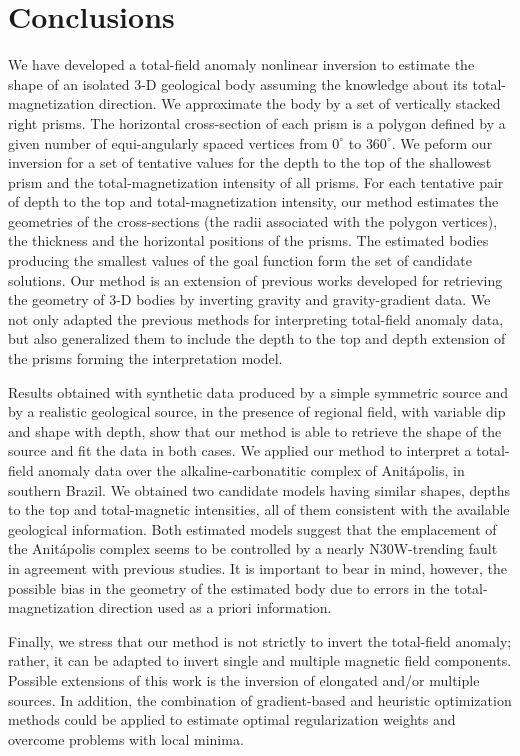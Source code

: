 \section{Conclusions}

We have developed a total-field anomaly nonlinear inversion to estimate the shape 
of an isolated 3-D geological body assuming the knowledge about its 
total-magnetization direction. We approximate the body by a set of vertically 
stacked right prisms. The horizontal cross-section of each prism is a polygon defined by a given number of
equi-angularly spaced vertices from $0^\circ$ to $360^\circ$. 
We peform our inversion for a set of tentative values for the depth to the top 
of the shallowest prism and the total-magnetization intensity of all prisms. 
For each tentative pair of depth to the top and total-magnetization intensity,
our method estimates the geometries of the cross-sections (the radii associated with the polygon vertices), the thickness and the horizontal positions of the prisms. 
The estimated bodies producing the smallest values of the goal function form the 
set of candidate solutions.
Our method is an extension of previous works developed for retrieving the geometry 
of 3-D bodies by inverting gravity and gravity-gradient data. 
We not only adapted the previous methods for interpreting total-field anomaly data,
but also generalized them to include the depth to the top and depth extension of 
the prisms forming the interpretation model.

Results obtained with synthetic data produced by a simple symmetric source 
and by a realistic geological source, in the presence of regional field, 
with variable dip and shape with depth, show that our method is able to retrieve 
the shape of the source and fit the data in both cases.
We applied our method to interpret a total-field anomaly data over the 
alkaline-carbonatitic complex of Anit{\'a}polis, in southern Brazil. 
We obtained two candidate models having similar shapes, depths to the top and 
total-magnetic intensities, all of them consistent with the available 
geological information. 
Both estimated models suggest that the emplacement of the 
Anit{\'a}polis complex seems to be controlled by a nearly N30W-trending fault
in agreement with previous studies.
It is important to bear in mind, however, the possible bias in the geometry of the
estimated body due to errors in the total-magnetization direction used as 
a priori information.

Finally, we stress that our method is not strictly to invert the total-field anomaly; 
rather, it can be adapted to invert single and multiple magnetic field components. 
Possible extensions of this work is the inversion of elongated and/or multiple 
sources. 
In addition, the combination of gradient-based and heuristic optimization 
methods could be applied to estimate optimal regularization weights and 
overcome problems with local minima.
